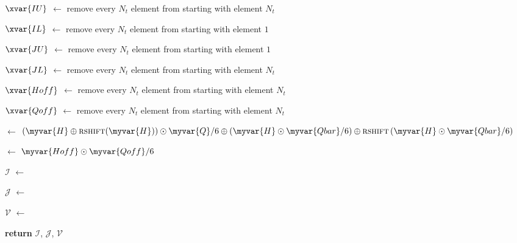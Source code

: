 \begin{algorithm}
\begin{algorithmic}[1]
	\EndFor

\EndFor

\State $\xvar{IU}$ $\gets$ remove every $N_t$ element from  starting with element $N_t$ 

\State $\xvar{IL}$ $\gets$ remove every $N_t$ element from  starting with element $1$ 

\State $\xvar{JU}$ $\gets$ remove every $N_t$ element from  starting with element $1$ 

\State $\xvar{JL}$ $\gets$ remove every $N_t$ element from  starting with element $N_t$ 

\State $\xvar{Hoff}$ $\gets$ remove every $N_t$ element from  starting with element $N_t$ 

\State $\xvar{Qoff}$ $\gets$ remove every $N_t$ element from  starting with element $N_t$ 

\State {} $\leftarrow$  $\left( \myvar{H} \oplus \textsc{rshift}(\myvar{H})  \right) \odot \myvar{Q}/6 \oplus
\left( \myvar{H}\odot \myvar{Qbar}/6  \right) \oplus
\textsc{rshift}\left( \myvar{H} \odot \myvar{Qbar}/6 \right)
$ \label{line:ch5:V}

\State {} $\leftarrow$ $\myvar{Hoff} \odot \myvar{Qoff}/6$ \label{line:ch5:Voff}

\State $\mathcal{I}$ $\gets$ 

\State $\mathcal{J}$ $\gets$ 

\State $\mathcal{V}$ $\gets$ 

\State \textbf{return} $\mathcal{I}$, $\mathcal{J}$, $\mathcal{V}$ 

\vspace*{0.1in}


\end{algorithmic}
\end{algorithm}

